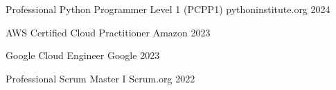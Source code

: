 

\begin{cvhonors}

  \cvhonor
    {Professional Python Programmer Level 1 (PCPP1)} %
    {pythoninstitute.org} %
    {} %
    {2024} %
    
  \cvhonor
    {AWS Certified Cloud Practitioner} %
    {Amazon} %
    {} %
    {2023} %
    
  \cvhonor
    {Google Cloud Engineer} %
    {Google} %
    {} %
    {2023} %
    

  \cvhonor
    {Professional Scrum Master I} %
    {Scrum.org} %
    {} %
    {2022} %


\end{cvhonors}
